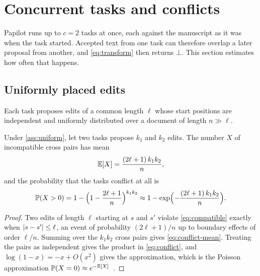 \section{Concurrent tasks and conflicts}
\label{sec:conflicts}

Papilot runs up to $c = 2$ tasks at once, each against the manuscript as it was
when the task started. Accepted text from one task can therefore overlap a
later proposal from another, and \cref{eq:transform} then returns $\bot$.
This section estimates how often that happens.

\subsection{Uniformly placed edits}

\begin{assumption}
\label{ass:uniform}
Each task proposes edits of a common length $\ell$ whose start positions are
independent and uniformly distributed over a document of length $n \gg \ell$.
\end{assumption}

\begin{proposition}
\label{prop:conflict}
Under \cref{ass:uniform}, let two tasks propose $k_1$ and $k_2$ edits. The
number $X$ of incompatible cross pairs has mean
\begin{equation}
  \mathbb{E}[X] = \frac{(2\ell + 1)\, k_1 k_2}{n},
  \label{eq:conflict-mean}
\end{equation}
and the probability that the tasks conflict at all is
\begin{equation}
  \mathbb{P}(X > 0)
  = 1 - \Bigl(1 - \frac{2\ell + 1}{n}\Bigr)^{k_1 k_2}
  \approx 1 - \exp\Bigl(-\frac{(2\ell+1)\, k_1 k_2}{n}\Bigr).
  \label{eq:conflict}
\end{equation}
\end{proposition}

\begin{proof}
Two edits of length $\ell$ starting at $s$ and $s'$ violate
\cref{eq:compatible} exactly when $\lvert s - s'\rvert \le \ell$, an event of
probability $(2\ell+1)/n$ up to boundary effects of order $\ell/n$. Summing over
the $k_1 k_2$ cross pairs gives \cref{eq:conflict-mean}. Treating the pairs as
independent gives the product in \cref{eq:conflict}, and
$\log(1-x) = -x + O(x^2)$ gives the approximation, which is the Poisson
approximation $\mathbb{P}(X = 0) \approx e^{-\mathbb{E}[X]}$~\cite{feller1968}.
\end{proof}

